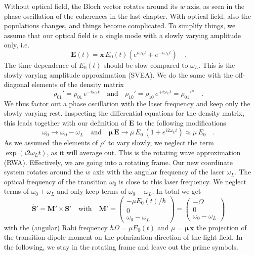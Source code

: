 Without optical field, the Bloch vector rotates around its $w$ axis, as seen in the phase oscillation of the coherences in the last chapter. With optical field, also the populations changes, and things become complicated.
To simplify things, we assume that our optical field is a single mode with a slowly varying amplitude only, i.e.
\begin{equation}
 \boldsymbol{E}(t) = \boldsymbol{x} \, E_0(t) \left( e^{i \omega_L t} + e^{-i \omega_L t} \right) \quad .
\end{equation}
The time-dependence of $E_0(t)$ should be slow compared to $\omega_L$. This is the slowly varying amplitude approximation (SVEA). We do the same with the off-diagonal elements of the density matrix
\begin{equation}
 \rho_{01}' = \rho_{01} \, e^{-i \omega_L t}  \quad \text{and} \quad
 \rho_{10}' = \rho_{10} \, e^{+i \omega_L t} = \rho_{01}'^\star \quad .
\end{equation}
We thus factor out a phase oscillation with the laser frequency and keep only the slowly varying rest. Inspecting the differential equations for the density matrix, this leads together with our definition of $\boldsymbol{E}$ to the following modifications
\begin{equation}
 \omega_0 \rightarrow \omega_0 - \omega_L \quad \text{and} \quad 
 \boldsymbol{\mu} \, \boldsymbol{E}  \rightarrow \mu \, E_0  \, ( 1+ e^{i 2\omega_L t} ) \approx \mu \, E_0  \quad .
\end{equation}
As we assumed the elements of $\rho'$ to vary slowly, we neglect the term $\exp(i 2 \omega_L t)$, as it will average out.  This is the rotating wave approximation (RWA). Effectively, we are going into a 
rotating frame. Our new coordinate system rotates around the $w$ axis with the angular frequency of the laser $\omega_L$. The optical frequency of the transition $\omega_0$ is close to this laser frequency. We neglect terms of $\omega_0 + \omega_L$ and only keep terms of  $\omega_0 - \omega_L$. In total we get
\begin{equation}
 \dot{\boldsymbol{S}'} = \boldsymbol{M}'   \times \boldsymbol{S}' 
 \quad \text{with} \quad 
 \boldsymbol{M}'  = 
 \begin{pmatrix}
- \mu    E_0(t) / \hbar \\
0 \\
\omega_0 - \omega_L
 \end{pmatrix} = 
  \begin{pmatrix}
- \Omega \\
0 \\
\omega_0 - \omega_L
 \end{pmatrix}  \label{eq:rabi_bloch_vector_RWA}
\end{equation}
with the (angular) Rabi frequency $\hbar \Omega = \mu    E_0(t) $ and $\mu = \boldsymbol{\mu \, x}$ the projection of the transition dipole moment on the polarization direction of the light field. In the following, we stay in the rotating frame and leave out the prime symbols.



